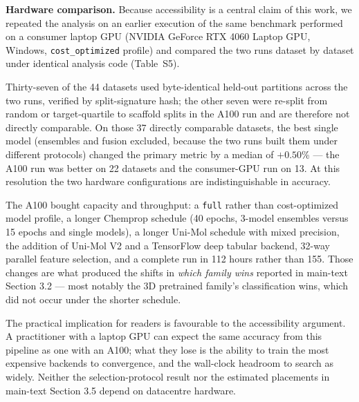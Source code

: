 \documentclass[11pt,a4paper]{article}
\begin{document}
\textbf{Hardware comparison.} Because accessibility is a central claim of this work, we repeated the analysis on an earlier execution of the same benchmark performed on a consumer laptop GPU (NVIDIA GeForce RTX 4060 Laptop GPU, Windows, \texttt{cost\_optimized} profile) and compared the two runs dataset by dataset under identical analysis code (Table~S5).

Thirty-seven of the 44 datasets used byte-identical held-out partitions across the two runs, verified by split-signature hash; the other seven were re-split from random or target-quartile to scaffold splits in the A100 run and are therefore not directly comparable. On those 37 directly comparable datasets, the best single model (ensembles and fusion excluded, because the two runs built them under different protocols) changed the primary metric by a median of $+0.50$\% --- the A100 run was better on 22 datasets and the consumer-GPU run on 13. At this resolution the two hardware configurations are indistinguishable in accuracy.

The A100 bought capacity and throughput: a \texttt{full} rather than cost-optimized model profile, a longer Chemprop schedule (40 epochs, 3-model ensembles versus 15 epochs and single models), a longer Uni-Mol schedule with mixed precision, the addition of Uni-Mol V2 and a TensorFlow deep tabular backend, 32-way parallel feature selection, and a complete run in 112 hours rather than 155. Those changes are what produced the shifts in \emph{which family wins} reported in main-text Section 3.2 --- most notably the 3D pretrained family's classification wins, which did not occur under the shorter schedule.

The practical implication for readers is favourable to the accessibility argument. A practitioner with a laptop GPU can expect the same accuracy from this pipeline as one with an A100; what they lose is the ability to train the most expensive backends to convergence, and the wall-clock headroom to search as widely. Neither the selection-protocol result nor the estimated placements in main-text Section 3.5 depend on datacentre hardware.

\clearpage


\end{document}

